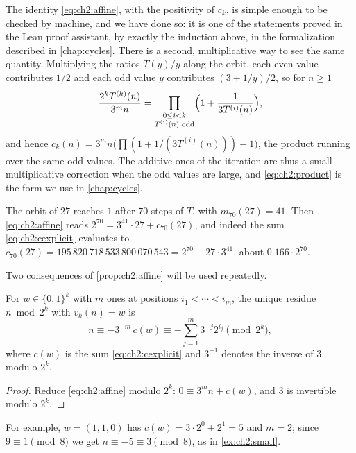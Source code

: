 The identity \eqref{eq:ch2:affine}, with the positivity of $c_k$, is simple
enough to be checked by machine, and we have done so: it is one of the
statements proved in the Lean proof assistant, by exactly the induction above,
in the formalization described in \cref{chap:cycles}. There is a second,
multiplicative way to see the same quantity. Multiplying the ratios
$T(y)/y$ along the orbit, each even value contributes $1/2$ and each odd value
$y$ contributes $(3+1/y)/2$, so for $n\geq1$
\begin{equation}\label{eq:ch2:product}
  \frac{2^kT^{(k)}(n)}{3^{m}n}=\prod_{\substack{0\leq i<k\\ T^{(i)}(n)\text{ odd}}}
  \Bigl(1+\frac{1}{3T^{(i)}(n)}\Bigr),
\end{equation}
and hence $c_k(n)=3^mn\bigl(\prod(1+1/(3T^{(i)}(n)))-1\bigr)$, the product
running over the same odd values.
The additive ones of the iteration are thus a small multiplicative correction
when the odd values are large, and \eqref{eq:ch2:product} is the form we use
in \cref{chap:cycles}.

\begin{example}\label{ex:ch2:c27}
The orbit of $27$ reaches $1$ after $70$ steps of $T$, with $m_{70}(27)=41$.
Then \eqref{eq:ch2:affine} reads $2^{70}=3^{41}\cdot27+c_{70}(27)$, and indeed
the sum \eqref{eq:ch2:cexplicit} evaluates to
$c_{70}(27)=195\,820\,718\,533\,800\,070\,543=2^{70}-27\cdot3^{41}$, about
$0.166\cdot2^{70}$.
\end{example}

Two consequences of \cref{prop:ch2:affine} will be used repeatedly.

\begin{corollary}\label{cor:ch2:inverse}
For $w\in\{0,1\}^k$ with $m$ ones at positions $i_1<\cdots<i_m$, the unique
residue $n\bmod2^k$ with $v_k(n)=w$ is
\[
  n\equiv-3^{-m}\,c(w)\equiv-\sum_{j=1}^{m}3^{-j}2^{i_j}\pmod{2^k},
\]
where $c(w)$ is the sum \eqref{eq:ch2:cexplicit} and $3^{-1}$ denotes the
inverse of $3$ modulo $2^k$.
\end{corollary}

\begin{proof}
Reduce \eqref{eq:ch2:affine} modulo $2^k$: $0\equiv3^mn+c(w)$, and $3$ is
invertible modulo $2^k$.
\end{proof}

For example, $w=(1,1,0)$ has $c(w)=3\cdot2^0+2^1=5$ and $m=2$; since
$9\equiv1\pmod8$ we get $n\equiv-5\equiv3\pmod8$, as in \cref{ex:ch2:small}.

